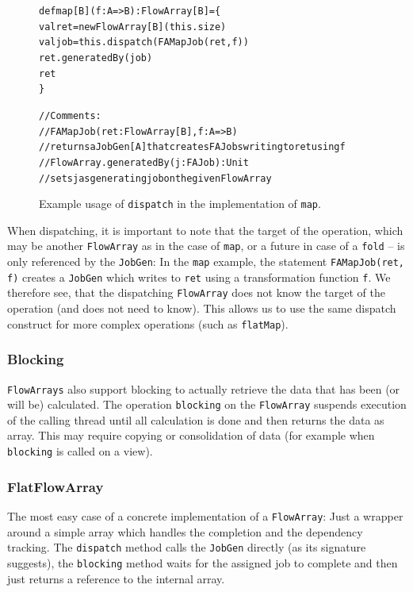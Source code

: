 \documentclass[runningheads,a4paper,fleqn]{llncs}
\begin{document}
\begin{figure}
\begin{alltt}
{\scriptsize
def map[B](f: A => B): FlowArray[B] = \{
    val ret = newFlowArray[B](this.size)
    val job = this.dispatch(FAMapJob(ret, f))
    ret.generatedBy(job)
    ret
\}

// Comments:
//  FAMapJob(ret: FlowArray[B], f: A => B)
//    returns a JobGen[A] that creates FAJobs writing to ret using f
//  FlowArray.generatedBy(j: FAJob): Unit
//    sets j as generating job on the given FlowArray
}
\end{alltt}
\caption{Example usage of \texttt{dispatch} in the implementation of
  \texttt{map}.}
\label{fig:dispatch-example}
\end{figure}

When dispatching, it is important to note that the target of the
operation, which may be another \texttt{FlowArray} as in the case of
\texttt{map}, or a future in case of a \texttt{fold} -- is only
referenced by the \texttt{JobGen}: In the \texttt{map} example, the
statement \texttt{FAMapJob(ret, f)} creates a
\texttt{JobGen} which writes to \texttt{ret} using a transformation
function \texttt{f}. We therefore see, that the dispatching \texttt{FlowArray}
does not know the target of the operation (and does not need to
know). This allows us to use the same dispatch construct for more
complex operations (such as \texttt{flatMap}).

\subsubsection{Blocking}
\texttt{FlowArrays} also support blocking to actually retrieve the data that
has been (or will be) calculated. The operation \texttt{blocking} on
the \texttt{FlowArray} suspends execution of the calling thread until all
calculation is done and then returns the data as array. This may
require copying or consolidation of data (for example when
\texttt{blocking} is called on a view).

\subsubsection{FlatFlowArray}
The most easy case of a concrete implementation of a \texttt{FlowArray}: Just a
wrapper around a simple array which handles the completion and the
dependency tracking. The \texttt{dispatch} method calls the
\texttt{JobGen} directly (as its signature suggests), the
\texttt{blocking} method waits for the assigned job to complete and
then just returns a reference to the internal array.
\end{document}
